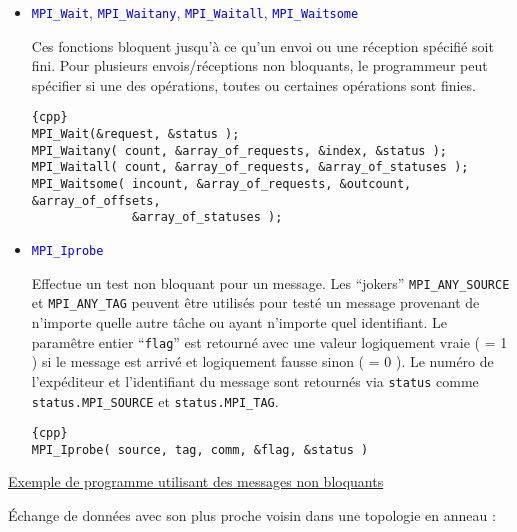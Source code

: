 \documentclass[11pt,a4paper]{article}
\begin{document}
\begin{itemize}
\begin{lstlisting}{cpp}
MPI_Test(&request, &flag, &status );
MPI_Testany( count, &array_of_requests, &index, &flag, &status );
MPI_Testall( count, &array_of_requests, &flag, &array_of_statuses );
MPI_Testsome( incount, &array_of_requests, &outcount, &array_of_offsets, 
              &array_of_statuses );
\end{lstlisting}

\item \textcolor{blue}{\texttt{MPI\_Wait}, \texttt{MPI\_Waitany}, \texttt{MPI\_Waitall}, \texttt{MPI\_Waitsome}}

Ces fonctions bloquent jusqu'à ce qu'un envoi ou une réception spécifié soit fini. Pour plusieurs envois/réceptions
non bloquants, le programmeur peut spécifier si une des opérations, toutes ou certaines opérations sont finies.

\begin{lstlisting}{cpp}
MPI_Wait(&request, &status );
MPI_Waitany( count, &array_of_requests, &index, &status );
MPI_Waitall( count, &array_of_requests, &array_of_statuses );
MPI_Waitsome( incount, &array_of_requests, &outcount, &array_of_offsets, 
              &array_of_statuses );
\end{lstlisting}

\item \textcolor{blue}{\texttt{MPI\_Iprobe}}

Effectue un test non bloquant pour un message. Les ``jokers'' \texttt{MPI\_ANY\_SOURCE} et \texttt{MPI\_ANY\_TAG}
peuvent être utilisés pour testé un message provenant de n'importe quelle autre tâche ou ayant n'importe
quel identifiant. Le paramêtre entier ``\texttt{flag}'' est retourné avec une valeur logiquement vraie ( = 1 )
si le message est arrivé et logiquement fausse sinon ( = 0 ). Le numéro de l'expéditeur et l'identifiant du
message sont retournés via \texttt{status} comme \texttt{status.MPI\_SOURCE} et \texttt{status.MPI\_TAG}.

\begin{lstlisting}{cpp}
MPI_Iprobe( source, tag, comm, &flag, &status )
\end{lstlisting}

\end{itemize}

\underline{Exemple de programme utilisant des messages non bloquants}

\'Echange de données avec son plus proche voisin dans une topologie en anneau :
\end{document}
